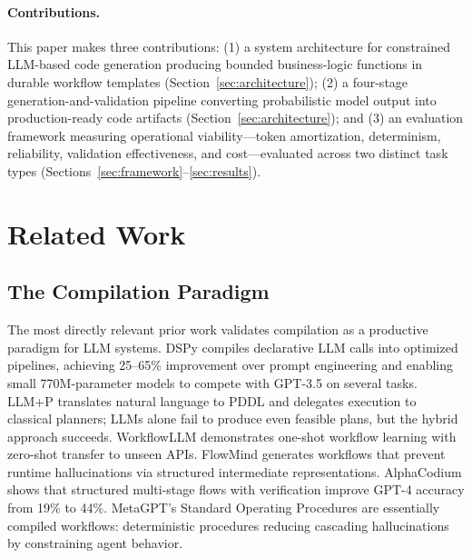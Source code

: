 \documentclass[11pt]{article}
\begin{document}
\paragraph{Contributions.} This paper makes three contributions: (1) a system architecture for constrained LLM-based code generation producing bounded business-logic functions in durable workflow templates (Section~\ref{sec:architecture}); (2) a four-stage generation-and-validation pipeline converting probabilistic model output into production-ready code artifacts (Section~\ref{sec:architecture}); and (3) an evaluation framework measuring operational viability---token amortization, determinism, reliability, validation effectiveness, and cost---evaluated across two distinct task types (Sections~\ref{sec:framework}--\ref{sec:results}).

\section{Related Work}
\label{sec:related-work}

\subsection{The Compilation Paradigm}
\label{sec:related-compilation}

The most directly relevant prior work validates compilation as a productive paradigm for LLM systems. DSPy \citep{khattab2023dspy} compiles declarative LLM calls into optimized pipelines, achieving 25--65\% improvement over prompt engineering and enabling small 770M-parameter models to compete with GPT-3.5 on several tasks. LLM+P \citep{liu2023llmp} translates natural language to PDDL and delegates execution to classical planners; LLMs alone fail to produce even feasible plans, but the hybrid approach succeeds. WorkflowLLM \citep{fan2024workflowllm} demonstrates one-shot workflow learning with zero-shot transfer to unseen APIs. FlowMind \citep{zeng2024flowmind} generates workflows that prevent runtime hallucinations via structured intermediate representations. AlphaCodium \citep{ridnik2024alphacodium} shows that structured multi-stage flows with verification improve GPT-4 accuracy from 19\% to 44\%. MetaGPT's Standard Operating Procedures \citep{hong2024metagpt} are essentially compiled workflows: deterministic procedures reducing cascading hallucinations by constraining agent behavior.
\end{document}
